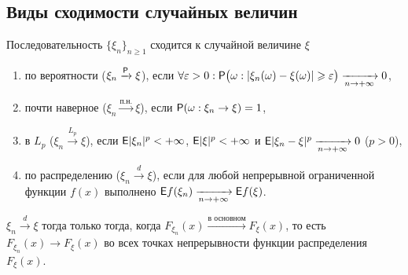  \subsection{Виды сходимости случайных величин}
 \begin{definition}
 	Последовательность $\{\xi_n \}_{n \geqslant 1}$ сходится к случайной величине $\xi$
 	\begin{enumerate}
 		\item {по вероятности ($\xi_n \xrightarrow{\P} \xi$), если 
 			$\forall \varepsilon > 0: \P\big(\omega:|\xi_n(\omega) - \xi(\omega)| 
 			\geqslant \varepsilon \big) \limn 0$,}
 		\item {почти наверное ($\xi_n \xrightarrow{\text{п.н.}} \xi$), если 
 			$\P(\omega: \xi_n \rightarrow \xi) = 1$,}
 		\item {в $L_p$ ($\xi_n \xrightarrow{L_p} \xi$), если $\E |\xi_n |^p < + \infty$, $\E |\xi|^p < +\infty$ и $\E | \xi_n - \xi |^p \limn 0$ ($p > 0$),}
 		\item {по распределению ($\xi_n \xrightarrow{d} \xi$), если для любой непрерывной ограниченной функции $f(x)$ выполнено $\E f (\xi_n) \limn \E f(\xi)$.}
 	\end{enumerate}
 \end{definition}
 \begin{theorem}[Александрова][б/д]
 	$\xi_n \xrightarrow{d} \xi$ тогда только тогда, когда 
 	$F_{\xi_n}(x) \xrightarrow{\text{в основном}} F_\xi (x)$, то есть 
 	$F_{\xi_n}(x) \rightarrow F_\xi(x)$ во всех точках непрерывности 
 	функции распределения $F_\xi(x)$. 
 \end{theorem}
